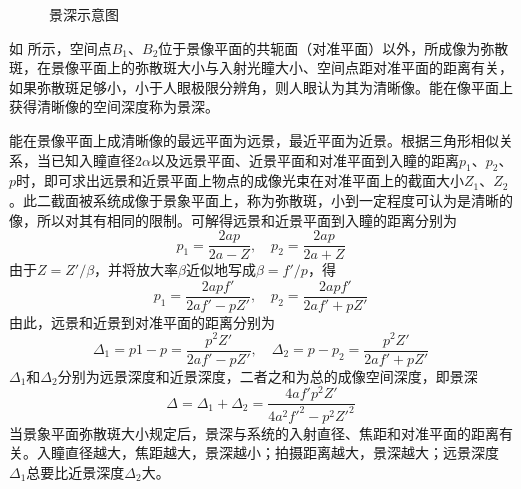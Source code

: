 \documentclass[cn,10pt,chinesefont=founder,math=newtx,cite=super,twoside]{elegantbook}
\begin{document}
\begin{figure}[htbp]
	\caption{景深示意图}
	\label{fig:depth-of-field}
\end{figure}

如 所示，空间点$B_1$、$B_2$位于景像平面的共轭面（对准平面）以外，所成像为弥散斑，在景像平面上的弥散斑大小与入射光瞳大小、空间点距对准平面的距离有关，如果弥散斑足够小，小于人眼极限分辨角，则人眼认为其为清晰像。能在像平面上获得清晰像的空间深度称为景深。

能在景像平面上成清晰像的最远平面为远景，最近平面为近景。根据三角形相似关系，当已知入瞳直径$2\alpha$以及远景平面、近景平面和对准平面到入瞳的距离$p_1$、$p_2$、$p$时，即可求出远景和近景平面上物点的成像光束在对准平面上的截面大小$Z_1$、$Z_2$。此二截面被系统成像于景象平面上，称为弥散斑，小到一定程度可认为是清晰的像，所以对其有相同的限制。可解得远景和近景平面到入瞳的距离分别为
\begin{equation}
p_1=\frac{2ap}{2a-Z},\quad p_2=\frac{2ap}{2a+Z}
\end{equation}
由于$Z=Z'/\beta$，并将放大率$\beta$近似地写成$\beta=f'/p$，得
\begin{equation}
p_1=\frac{2apf'}{2af'-pZ'},\quad p_2=\frac{2apf'}{2af'+pZ'}
\end{equation}
由此，远景和近景到对准平面的距离分别为
\begin{equation}
\varDelta_1=p1-p=\frac{p^2Z'}{2af'-pZ'},\quad \varDelta_2=p-p_2=\frac{p^2Z'}{2af'+pZ'}
\end{equation}
$\varDelta_1$和$\varDelta_2$分别为远景深度和近景深度，二者之和为总的成像空间深度，即景深
\begin{equation}
\varDelta=\varDelta_1+\varDelta_2=\frac{4af'p^2Z'}{4a^2f'^2-p^2Z'^2}
\end{equation}
当景象平面弥散斑大小规定后，景深与系统的入射直径、焦距和对准平面的距离有关。入瞳直径越大，焦距越大，景深越小；拍摄距离越大，景深越大；远景深度$\varDelta_1$总要比近景深度$\varDelta_2$大。
\end{document}
